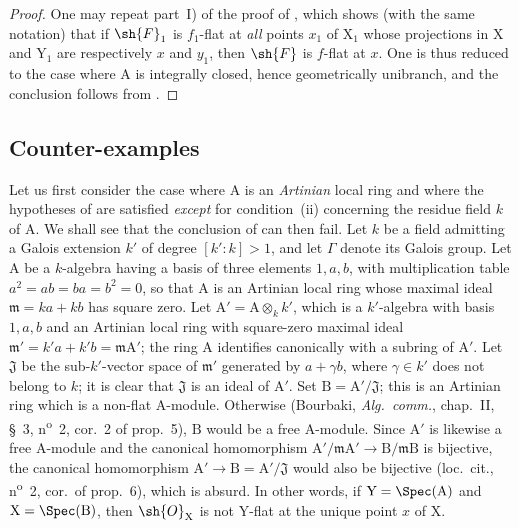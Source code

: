 \begin{proof}
One may repeat part~I) of the proof of , which shows (with the same notation) that if $\sh{F}_1$ is $f_1$-flat at \emph{all} points $x_1$ of $\mathrm{X}_1$ whose projections in $\mathrm{X}$ and $\mathrm{Y}_1$ are respectively $x$ and $y_1$, then $\sh{F}$ is $f$-flat at $x$.
One is thus reduced to the case where $\mathrm{A}$ is integrally closed, hence geometrically unibranch, and the conclusion follows from .
\end{proof}

\subsection{Counter-examples}
\label{subsection:IV.11.7}

\begin{env}[11.7.1]
\label{IV.11.7.1}
Let us first consider the case where $\mathrm{A}$ is an \emph{Artinian} local ring and where the hypotheses of  are satisfied \emph{except} for condition~(ii) concerning the residue field $k$ of $\mathrm{A}$. We shall see that the conclusion of  can then fail.
Let $k$ be a field admitting a Galois extension $k'$ of degree $[k':k]>1$, and let $\Gamma$ denote its Galois group.
Let $\mathrm{A}$ be a $k$-algebra having a basis of three elements $1,a,b$, with multiplication table $a^2=ab=ba=b^2=0$, so that $\mathrm{A}$ is an Artinian local ring whose maximal ideal $\mathfrak{m}=ka+kb$ has square zero.
Let $\mathrm{A}'=\mathrm{A}\otimes_k k'$, which is a $k'$-algebra with basis $1,a,b$ and an Artinian local ring with square-zero maximal ideal $\mathfrak{m}'=k'a+k'b=\mathfrak{m}\mathrm{A}'$; the ring $\mathrm{A}$ identifies canonically with a subring of $\mathrm{A}'$.
Let $\mathfrak{J}$ be the sub-$k'$-vector space of $\mathfrak{m}'$ generated by $a+\gamma b$, where $\gamma\in k'$ does not belong to $k$; it is clear that $\mathfrak{J}$ is an ideal of $\mathrm{A}'$.
Set $\mathrm{B}=\mathrm{A}'/\mathfrak{J}$; this is an Artinian ring which is a non-flat $\mathrm{A}$-module. Otherwise (Bourbaki, \emph{Alg.\ comm.}, chap.~II, \S~3, n\textsuperscript{o}~2, cor.~2 of prop.~5), $\mathrm{B}$ would be a free $\mathrm{A}$-module. Since $\mathrm{A}'$ is likewise a free $\mathrm{A}$-module and the canonical homomorphism $\mathrm{A}'/\mathfrak{m}\mathrm{A}'\to\mathrm{B}/\mathfrak{m}\mathrm{B}$ is bijective, the canonical homomorphism $\mathrm{A}'\to\mathrm{B}=\mathrm{A}'/\mathfrak{J}$ would also
be bijective (loc.~cit., n\textsuperscript{o}~2, cor.~of prop.~6), which is absurd. In other words, if $\mathrm{Y}=\Spec(\mathrm{A})$ and $\mathrm{X}=\Spec(\mathrm{B})$, then $\sh{O}_\mathrm{X}$ is not $\mathrm{Y}$-flat at the unique point $x$ of $\mathrm{X}$.

\end{env}
